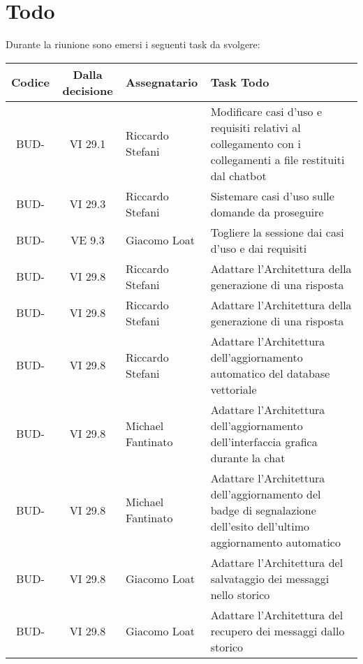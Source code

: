 
\section{Todo}

Durante la riunione sono emersi i seguenti task da svolgere:

\vspace{0.5cm}

\begin{table}[htbp]
\centering
{}
\begin{tabular}{|c|c|p{}|p{}|}
    \hline
    \rowcolor[gray]{0.75}
    \textbf{Codice} & \textbf{Dalla decisione} & \textbf{Assegnatario} & \textbf{Task Todo} \\
    \hline
    BUD- & VI 29.1 & Riccardo Stefani & Modificare casi d'uso e requisiti relativi al collegamento con i collegamenti a file restituiti dal chatbot\\
    \hline
    BUD- & VI 29.3 & Riccardo Stefani & Sistemare casi d'uso sulle domande da proseguire\\
    \hline
    BUD- & VE 9.3 & Giacomo Loat & Togliere la sessione dai casi d'uso e dai requisiti\\
    \hline
    BUD- & VI 29.8 & Riccardo Stefani & Adattare l'Architettura della generazione di una risposta\\
    \hline
    BUD- & VI 29.8 & Riccardo Stefani & Adattare l'Architettura della generazione di una risposta\\
    \hline
    BUD- & VI 29.8 & Riccardo Stefani & Adattare l'Architettura dell’aggiornamento automatico del database vettoriale\\
    \hline
    BUD- & VI 29.8 & Michael Fantinato & Adattare l'Architettura dell’aggiornamento dell’interfaccia grafica durante la chat \\
    \hline
    BUD- & VI 29.8 & Michael Fantinato & Adattare l'Architettura dell’aggiornamento del badge di segnalazione dell’esito dell’ultimo aggiornamento automatico\\
    \hline
    BUD- & VI 29.8 & Giacomo Loat & Adattare l'Architettura del salvataggio dei messaggi nello storico\\
    \hline
    BUD- & VI 29.8 & Giacomo Loat & Adattare l'Architettura del recupero dei messaggi dallo storico\\
    \hline

\end{tabular}
\end{table}
